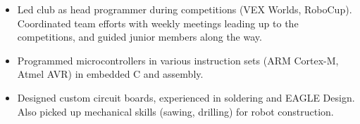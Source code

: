 
\begin{itemize}
  \item Led club as head programmer during competitions (VEX Worlds, RoboCup). Coordinated team efforts with weekly meetings leading up to the competitions, and guided junior members along the way.
  \item Programmed microcontrollers in various instruction sets (ARM Cortex-M, Atmel AVR) in embedded C and assembly. 
  \item Designed custom circuit boards, experienced in soldering and EAGLE Design. Also picked up mechanical skills (sawing, drilling) for robot construction.
\end{itemize}